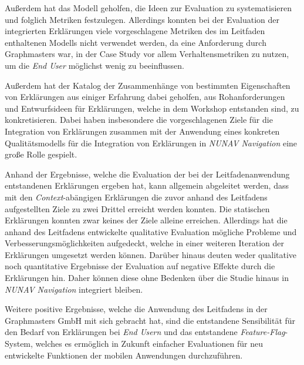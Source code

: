 Außerdem hat das Modell geholfen, die Ideen zur Evaluation zu systematisieren und folglich Metriken festzulegen. Allerdings konnten bei der Evaluation der integrierten Erklärungen viele vorgeschlagene Metriken des im Leitfaden enthaltenen Modells nicht verwendet werden, da eine Anforderung durch Graphmasters war, in der Case Study vor allem Verhaltensmetriken zu nutzen, um die \textit{End User} möglichst wenig zu beeinflussen.

Außerdem hat der Katalog der Zusammenhänge von bestimmten Eigenschaften von Erklärungen aus einiger Erfahrung dabei geholfen, aus Rohanforderungen und Entwurfsideen für Erklärungen, welche in dem Workshop entstanden sind, zu konkretisieren. Dabei haben insbesondere die vorgeschlagenen Ziele für die Integration von Erklärungen zusammen mit der Anwendung eines konkreten Qualitätsmodells für die Integration von Erklärungen in \textit{NUNAV Navigation} eine große Rolle gespielt.

Anhand der Ergebnisse, welche die Evaluation der bei der Leitfadenanwendung entstandenen Erklärungen ergeben hat, kann allgemein abgeleitet werden, dass mit den \textit{Context}-abängigen Erklärungen die zuvor anhand des Leitfadens aufgestellten Ziele zu zwei Drittel erreicht werden konnten. Die statischen Erklärungen konnten zwar keines der Ziele alleine erreichen. Allerdings hat die anhand des Leitfadens entwickelte qualitative Evaluation mögliche Probleme und Verbesserungsmöglichkeiten aufgedeckt, welche in einer weiteren Iteration der Erklärungen umgesetzt werden können. Darüber hinaus deuten weder qualitative noch quantitative Ergebnisse der Evaluation auf negative Effekte durch die Erklärungen hin. Daher können diese ohne Bedenken über die Studie hinaus in \textit{NUNAV Navigation} integriert bleiben.

Weitere positive Ergebnisse, welche die Anwendung des Leitfadens in der Graphmasters GmbH mit sich gebracht hat, sind die entstandene Sensibilität für den Bedarf von Erklärungen bei \textit{End Usern} und das entstandene \textit{Feature-Flag}-System, welches es ermöglich in Zukunft einfacher Evaluationen für neu entwickelte Funktionen der mobilen Anwendungen durchzuführen.


\newpage